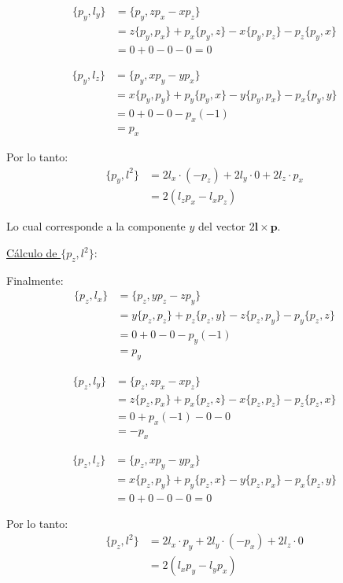 \documentclass[12pt]{article}
\begin{document}
\begin{enumerate}
  \begin{align}
  \{p_y, l_y\} &= \{p_y, zp_x - xp_z\}\\
  &= z\{p_y,p_x\} + p_x\{p_y,z\} - x\{p_y,p_z\} - p_z\{p_y,x\}\\
  &= 0 + 0 - 0 - 0 = 0
  \end{align}

  \begin{align}
  \{p_y, l_z\} &= \{p_y, xp_y - yp_x\}\\
  &= x\{p_y,p_y\} + p_y\{p_y,x\} - y\{p_y,p_x\} - p_x\{p_y,y\}\\
  &= 0 + 0 - 0 - p_x(-1)\\
  &= p_x
  \end{align}

  Por lo tanto:
  \begin{align}
  \{p_y, l^2\} &= 2l_x \cdot (-p_z) + 2l_y \cdot 0 + 2l_z \cdot p_x\\
  &= 2(l_zp_x - l_xp_z)
  \end{align}

  Lo cual corresponde a la componente $y$ del vector $2\mathbf{l}\times\mathbf{p}$.

  \underline{Cálculo de $\{p_z, l^2\}$}:

  Finalmente:
  \begin{align}
  \{p_z, l_x\} &= \{p_z, yp_z - zp_y\}\\
  &= y\{p_z,p_z\} + p_z\{p_z,y\} - z\{p_z,p_y\} - p_y\{p_z,z\}\\
  &= 0 + 0 - 0 - p_y(-1)\\
  &= p_y
  \end{align}

  \begin{align}
  \{p_z, l_y\} &= \{p_z, zp_x - xp_z\}\\
  &= z\{p_z,p_x\} + p_x\{p_z,z\} - x\{p_z,p_z\} - p_z\{p_z,x\}\\
  &= 0 + p_x(-1) - 0 - 0\\
  &= -p_x
  \end{align}

  \begin{align}
  \{p_z, l_z\} &= \{p_z, xp_y - yp_x\}\\
  &= x\{p_z,p_y\} + p_y\{p_z,x\} - y\{p_z,p_x\} - p_x\{p_z,y\}\\
  &= 0 + 0 - 0 - 0 = 0
  \end{align}

  Por lo tanto:
  \begin{align}
  \{p_z, l^2\} &= 2l_x \cdot p_y + 2l_y \cdot (-p_x) + 2l_z \cdot 0\\
  &= 2(l_xp_y - l_yp_x)
  \end{align}


\end{enumerate}
\end{document}
